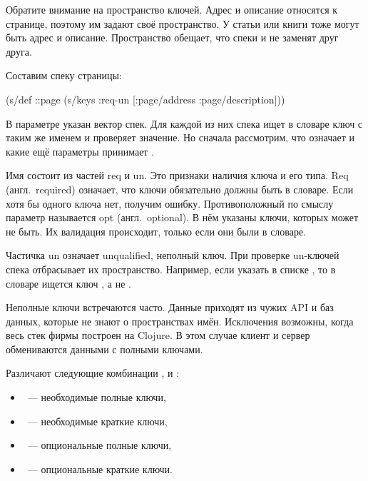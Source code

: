 
Обратите внимание на пространство ключей. Адрес и описание относятся к странице,
поэтому им задают своё пространство. У статьи или книги тоже могут быть адрес и
описание. Пространство обещает, что спеки  и
 не заменят друг друга.

Составим спеку страницы:


\begin{clojure}
(s/def ::page
  (s/keys :req-un [:page/address
                   :page/description]))
\end{clojure}



В параметре  указан вектор спек. Для каждой из них спека ищет в
словаре ключ с таким же именем и проверяет значение. Но сначала рассмотрим, что
означает  и какие ещё параметры принимает .

Имя  состоит из частей req и un. Это признаки наличия
ключа и его типа. Req (англ.~required) означает, что ключи обязательно должны
быть в словаре. Если хотя бы одного ключа нет, получим ошибку. Противоположный
по смыслу параметр называется opt (англ.~optional). В нём указаны ключи,
которых может не быть. Их валидация происходит, только если они были в словаре.


Частичка un означает unqualified, неполный ключ. При проверке un-ключей
спека отбрасывает их пространство. Например, если указать 
в списке , то в словаре ищется ключ , а не
.

Неполные ключи встречаются часто. Данные приходят из чужих API и баз данных,
которые не знают о пространствах имён. Исключения возможны, когда весь стек
фирмы построен на Clojure. В этом случае клиент и сервер обмениваются данными с
полными ключами.

Различают следующие комбинации ,  и :

\begin{itemize}

\item
  ~--- необходимые полные ключи,

\item
  ~--- необходимые краткие ключи,


\item
  ~--- опциональные полные ключи,


\item
  ~--- опциональные краткие ключи.

\end{itemize}

